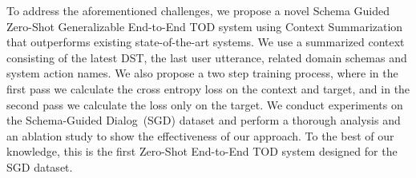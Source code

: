 To address the aforementioned challenges, we propose a novel Schema Guided Zero-Shot Generalizable End-to-End TOD system using Context Summarization
that outperforms existing state-of-the-art systems.
We use a summarized context consisting of the latest DST, the last user utterance, related domain schemas and system action names.
We also propose a two step training process, where in the first pass we calculate the cross entropy loss on the context and target, and
in the second pass we calculate the loss only on the target. We conduct experiments on the Schema-Guided Dialog~(SGD) dataset
and perform a thorough analysis and an ablation study to show the effectiveness of our approach. To the best of our knowledge,
this is the first Zero-Shot End-to-End TOD system designed for the SGD dataset.


